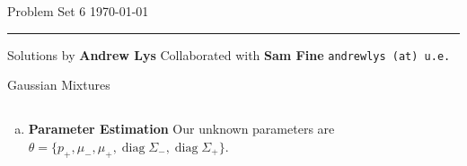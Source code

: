 \documentclass{amsart}
\DeclareMathOperator{\diag}{diag}
\theoremstyle{definition}
\begin{document}
\noindent
Problem Set 6   \hfill \today  %
\smallskip
\hrule
\smallskip
\noindent
Solutions by {\bf Andrew Lys} \qquad Collaborated with {\bf Sam Fine}   %
  {\tt andrewlys (at) u.e.}      %

\vspace{0.5cm}

\begin{center}
\LARGE Gaussian Mixtures
\end{center}
\subsection{}
\begin{enumerate}[(a)] 
	\item {\bf Parameter Estimation}
	Our unknown parameters are $\theta = \{ p_+, \mu_- , \mu_+ , \diag {\Sigma_- }, \diag {\Sigma_+ } \}$. 
        

\end{enumerate}
\end{document}

